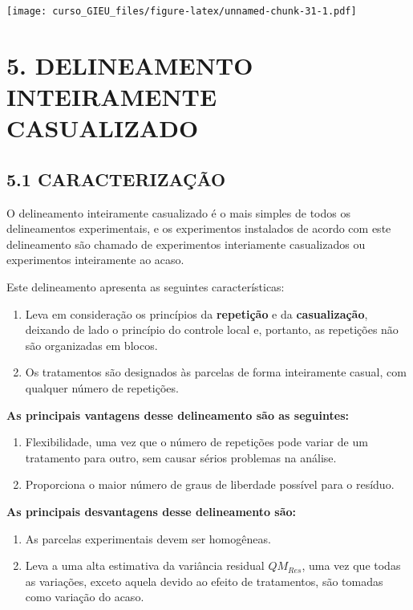 \documentclass[
]{book}
\begin{document}
\texttt{[image: curso\_GIEU\_files/figure-latex/unnamed-chunk-31-1.pdf]}

\hypertarget{delineamento-inteiramente-casualizado}{%
\chapter{5. DELINEAMENTO INTEIRAMENTE CASUALIZADO}\label{delineamento-inteiramente-casualizado}}

\hypertarget{caracterizauxe7uxe3o}{%
\section{5.1 CARACTERIZAÇÃO}\label{caracterizauxe7uxe3o}}

O delineamento inteiramente casualizado é o mais simples de todos os delineamentos experimentais, e os experimentos instalados de acordo com este delineamento são chamado de experimentos interiamente casualizados ou experimentos inteiramente ao acaso.

Este delineamento apresenta as seguintes características:

\begin{enumerate}
\def\labelenumi{\arabic{enumi}.}
\item
  Leva em consideração os princípios da \textbf{repetição} e da \textbf{casualização}, deixando de lado o princípio do controle local e, portanto, as repetições não são organizadas em blocos.
\item
  Os tratamentos são designados às parcelas de forma inteiramente casual, com qualquer número de repetições.
\end{enumerate}

\textbf{As principais vantagens desse delineamento são as seguintes:}

\begin{enumerate}
\def\labelenumi{\arabic{enumi})}
\item
  Flexibilidade, uma vez que o número de repetições pode variar de um tratamento para outro, sem causar sérios problemas na análise.
\item
  Proporciona o maior número de graus de liberdade possível para o resíduo.
\end{enumerate}

\textbf{As principais desvantagens desse delineamento são:}

\begin{enumerate}
\def\labelenumi{\arabic{enumi})}
\item
  As parcelas experimentais devem ser homogêneas.
\item
  Leva a uma alta estimativa da variância residual \(QM_{Res}\), uma vez que todas as variações, exceto aquela devido ao efeito de tratamentos, são tomadas como variação do acaso.
\end{enumerate}
\end{document}
